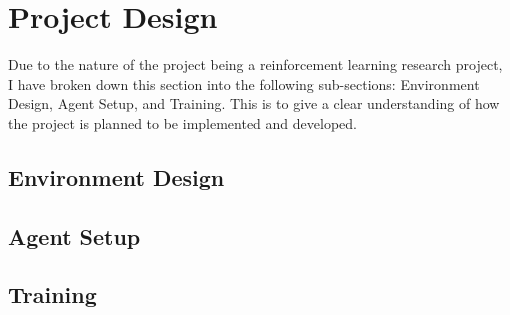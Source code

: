 \section{Project Design}

Due to the nature of the project being a reinforcement learning research project, I have broken down this section into the following sub-sections: Environment Design, Agent Setup, and Training. This is to give a clear understanding of how the project is planned to be implemented and developed.

\subsection{Environment Design}

\subsection{Agent Setup}

\subsection{Training}